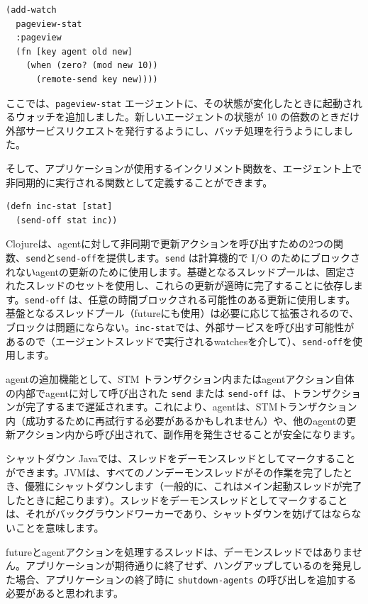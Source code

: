 \begin{lstlisting}[numbers=none]
(add-watch
  pageview-stat
  :pageview
  (fn [key agent old new]
    (when (zero? (mod new 10))
      (remote-send key new))))
\end{lstlisting}

ここでは、\texttt{pageview-stat} エージェントに、その状態が変化したときに起動されるウォッチを追加しました。新しいエージェントの状態が 10 の倍数のときだけ外部サービスリクエストを発行するようにし、バッチ処理を行うようにしました。

そして、アプリケーションが使用するインクリメント関数を、エージェント上で非同期的に実行される関数として定義することができます。


\begin{lstlisting}[numbers=none]
(defn inc-stat [stat]
  (send-off stat inc))
\end{lstlisting}

Clojureは、agentに対して非同期で更新アクションを呼び出すための2つの関数、\texttt{send}と\texttt{send-off}を提供します。\texttt{send} は計算機的で I/O のためにブロックされないagentの更新のために使用します。基礎となるスレッドプールは、固定されたスレッドのセットを使用し、これらの更新が適時に完了することに依存します。\texttt{send-off} は、任意の時間ブロックされる可能性のある更新に使用します。基盤となるスレッドプール（futureにも使用）は必要に応じて拡張されるので、ブロックは問題にならない。\texttt{inc-stat}では、外部サービスを呼び出す可能性があるので（エージェントスレッドで実行されるwatchesを介して）、\texttt{send-off}を使用します。

agentの追加機能として、STM トランザクション内またはagentアクション自体の内部でagentに対して呼び出された \texttt{send} または \texttt{send-off} は、トランザクションが完了するまで遅延されます。これにより、agentは、STMトランザクション内（成功するために再試行する必要があるかもしれません）や、他のagentの更新アクション内から呼び出されて、副作用を発生させることが安全になります。

\begin{itembox}[l]{}シャットダウン
Javaでは、スレッドをデーモンスレッドとしてマークすることができます。JVMは、すべてのノンデーモンスレッドがその作業を完了したとき、優雅にシャットダウンします（一般的に、これはメイン起動スレッドが完了したときに起こります）。スレッドをデーモンスレッドとしてマークすることは、それがバックグラウンドワーカーであり、シャットダウンを妨げてはならないことを意味します。

 futureとagentアクションを処理するスレッドは、デーモンスレッドではありません。アプリケーションが期待通りに終了せず、ハングアップしているのを発見した場合、アプリケーションの終了時に \texttt{shutdown-agents} の呼び出しを追加する必要があると思われます。
\end{itembox}


